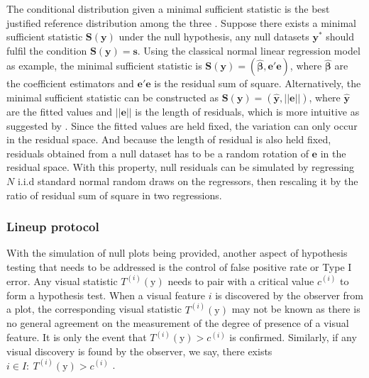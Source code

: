 \documentclass[]{interact}
\theoremstyle{plain}%
\theoremstyle{definition}
\theoremstyle{remark}
\begin{document}
The conditional distribution given a minimal sufficient statistic is the
best justified reference distribution among the three
\citep{buja_statistical_2009}. Suppose there exists a minimal sufficient
statistic \(\boldsymbol{S}(\boldsymbol{y})\) under the null hypothesis,
any null datasets \(\boldsymbol{y^{*}}\) should fulfil the condition
\(\boldsymbol{S}(\boldsymbol{y}) = \boldsymbol{s}\). Using the classical
normal linear regression model as example, the minimal sufficient
statistic is
\(\boldsymbol{S}(\boldsymbol{y}) = (\hat{\boldsymbol{\beta}}, \boldsymbol{e}'\boldsymbol{e})\),
where \(\hat{\boldsymbol{\beta}}\) are the coefficient estimators and
\(\boldsymbol{e}'\boldsymbol{e}\) is the residual sum of square.
Alternatively, the minimal sufficient statistic can be constructed as
\(\boldsymbol{S}(\boldsymbol{y}) = (\hat{\boldsymbol{y}}, ||\boldsymbol{e}||)\),
where \(\hat{\boldsymbol{y}}\) are the fitted values and
\(||\boldsymbol{e}||\) is the length of residuals, which is more
intuitive as suggested by \citet{buja_statistical_2009}. Since the
fitted values are held fixed, the variation can only occur in the
residual space. And because the length of residual is also held fixed,
residuals obtained from a null dataset has to be a random rotation of
\(\boldsymbol{e}\) in the residual space. With this property, null
residuals can be simulated by regressing \(N\) i.i.d standard normal
random draws on the regressors, then rescaling it by the ratio of
residual sum of square in two regressions.

\hypertarget{se:lineup}{%
\subsubsection{Lineup protocol}\label{se:lineup}}

With the simulation of null plots being provided, another aspect of
hypothesis testing that needs to be addressed is the control of false
positive rate or Type I error. Any visual statistic
\(T^{(i)}(\boldsymbol{\mathrm{y}})\) needs to pair with a critical value
\(c^{(i)}\) to form a hypothesis test. When a visual feature \(i\) is
discovered by the observer from a plot, the corresponding visual
statistic \(T^{(i)}(\boldsymbol{\mathrm{y}})\) may not be known as there
is no general agreement on the measurement of the degree of presence of
a visual feature. It is only the event that
\(T^{(i)}(\boldsymbol{\mathrm{y}}) > c^{(i)}\) is confirmed. Similarly,
if any visual discovery is found by the observer, we say, there exists
\(i \in I:~T^{(i)}(\boldsymbol{\mathrm{y}}) > c^{(i)}\)
\citep{buja_statistical_2009}.
\end{document}
